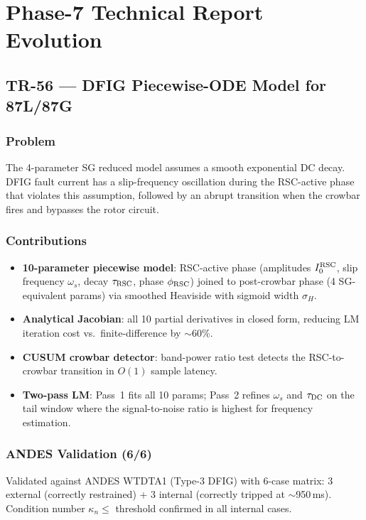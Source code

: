 \documentclass[12pt,a4paper]{article}
\newcommand{\kn}{\kappa_n}
\begin{document}
\section{Phase-7 Technical Report Evolution}
\label{sec:tr_evolution}

\subsection{TR-56 — DFIG Piecewise-ODE Model for 87L/87G}
\label{sec:tr56}

\subsubsection{Problem}
The 4-parameter SG reduced model assumes a smooth exponential DC decay.
DFIG fault current has a slip-frequency oscillation during the RSC-active
phase that violates this assumption, followed by an abrupt transition when
the crowbar fires and bypasses the rotor circuit.

\subsubsection{Contributions}
\begin{itemize}
  \item \textbf{10-parameter piecewise model}: RSC-active phase
    (amplitudes $I_0^{\rm RSC}$, slip frequency $\omega_s$, decay $\tau_{\rm RSC}$,
    phase $\phi_{\rm RSC}$) joined to post-crowbar phase (4 SG-equivalent params)
    via smoothed Heaviside with sigmoid width $\sigma_H$.
  \item \textbf{Analytical Jacobian}: all 10 partial derivatives in closed form,
    reducing LM iteration cost vs.\ finite-difference by $\sim$60\%.
  \item \textbf{CUSUM crowbar detector}: band-power ratio test detects the
    RSC-to-crowbar transition in $O(1)$ sample latency.
  \item \textbf{Two-pass LM}: Pass~1 fits all 10 params; Pass~2 refines
    $\omega_s$ and $\tau_{\rm DC}$ on the tail window where the signal-to-noise
    ratio is highest for frequency estimation.
\end{itemize}

\subsubsection{ANDES Validation (6/6)}
Validated against ANDES WTDTA1 (Type-3 DFIG) with 6-case matrix:
3 external (correctly restrained) + 3 internal (correctly tripped at $\sim$950\,ms).
Condition number $\kn \le$ threshold confirmed in all internal cases.
\end{document}
